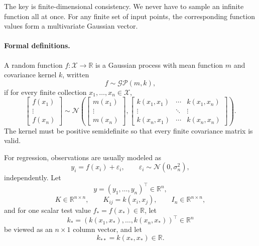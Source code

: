 The key is finite-dimensional consistency. We never have to sample an infinite function all at once. For any finite set of input points, the corresponding function values form a multivariate Gaussian vector.

\paragraph{Formal definitions.}
A random function \(f:\mathcal X\to\mathbb R\) is a Gaussian process with mean function \(m\) and covariance kernel \(k\), written
\[
\boxed{
f\sim\mathcal{GP}(m,k),
}
\]
if for every finite collection \(x_1,\ldots,x_n\in\mathcal X\),
\[
\begin{bmatrix}
f(x_1)\\
\vdots\\
f(x_n)
\end{bmatrix}
\sim
\mathcal N
\left(
\begin{bmatrix}
m(x_1)\\
\vdots\\
m(x_n)
\end{bmatrix},
\begin{bmatrix}
k(x_1,x_1)&\cdots&k(x_1,x_n)\\
\vdots&\ddots&\vdots\\
k(x_n,x_1)&\cdots&k(x_n,x_n)
\end{bmatrix}
\right).
\]
The kernel must be positive semidefinite so that every finite covariance matrix is valid.

For regression, observations are usually modeled as
\[
y_i=f(x_i)+\varepsilon_i,
\qquad
\varepsilon_i\sim\mathcal N(0,\sigma_n^2),
\]
independently. Let
\[
y=(y_1,\ldots,y_n)^\top\in\mathbb R^n,
\]
\[
K\in\mathbb R^{n\times n},
\qquad
K_{ij}=k(x_i,x_j),
\qquad
I_n\in\mathbb R^{n\times n},
\]
and for one scalar test value \(f_*=f(x_*)\in\mathbb R\), let
\[
k_*=(k(x_1,x_*),\ldots,k(x_n,x_*))^\top\in\mathbb R^n
\]
be viewed as an \(n\times1\) column vector, and let
\[
k_{**}=k(x_*,x_*)\in\mathbb R.
\]

